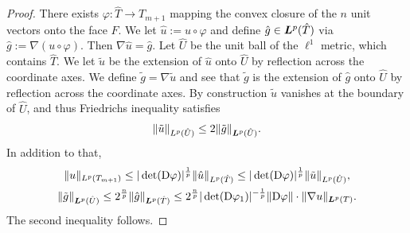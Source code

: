 \documentclass[10pt,a4paper]{article}
\begin{document}
\begin{proof}
    
    There exists $\varphi : \hat T \rightarrow T_{m+1}$ mapping the convex closure of the $n$ unit vectors onto the face $F$.
    We let $\hat u := u \circ \varphi$ and define $\hat g \in \bm{L}^p(\hat T)$ via $\hat g := \nabla ( u \circ \varphi )$. 
    Then $\nabla \hat u = \hat g$. 
    Let $\hat U$ be the unit ball of the $\ell^1$ metric, which contains $\hat T$.
    We let $\tilde u$ be the extension of $\hat u$ onto $\hat U$ by reflection across the coordinate axes.
    We define $\tilde g = \nabla \tilde u$
    and see that $\tilde g$ is the extension of $\hat g$ onto $\hat U$ by reflection across the coordinate axes. 
    By construction $\tilde u$ vanishes at the boundary of $\hat U$, and thus Friedrichs inequality satisfies 
    \begin{gather*}
        \| \tilde u \|_{L^{p}(\hat U)} 
        \leq 
        2 
        \| \tilde g \|_{\bm{L}^{p}(\hat U)}
        .
    \end{gather*}
    In addition to that, 
    \begin{gather*}
        \| u \|_{L^{p}(T_{m+1})}
        \leq 
        |\det({\mathrm D} \varphi)|^{\frac 1 p} 
        \| \hat u \|_{L^{p}(\hat T)}
        \leq 
        |\det({\mathrm D} \varphi)|^{\frac 1 p} 
        \| \tilde u \|_{L^{p}(\hat U)}
        ,
        \\
        \| \tilde g \|_{\bm{L}^{p}(\hat U)}
        \leq 
        2^{\frac n p}
        \| \hat g \|_{\bm{L}^{p}(\hat T)}
        \leq 
        2^{\frac n p}
        |\det({\mathrm D} \varphi_1)|^{-\frac 1 p} \| {\mathrm D} \varphi \| \cdot 
        \| \nabla u \|_{\bm{L}^{p}(T)}
        .
    \end{gather*}
    The second inequality follows.
\end{proof}
\end{document}
